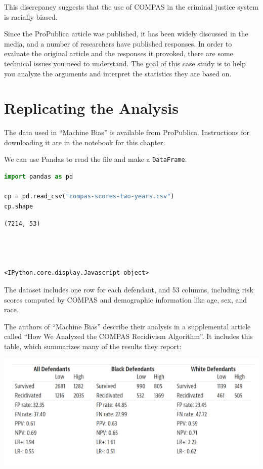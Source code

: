 This discrepancy suggests that the use of COMPAS in the criminal justice
system is racially biased.

Since the ProPublica article was published, it has been widely discussed
in the media, and a number of researchers have published responses. In
order to evaluate the original article and the responses it provoked,
there are some technical issues you need to understand. The goal of this
case study is to help you analyze the arguments and interpret the
statistics they are based on.

\hypertarget{replicating-the-analysis}{%
\section{Replicating the Analysis}\label{replicating-the-analysis}}

The data used in ``Machine Bias'' is available from ProPublica.
Instructions for downloading it are in the notebook for this chapter.

We can use Pandas to read the file and make a
\passthrough{\lstinline!DataFrame!}.

\begin{lstlisting}[language=Python,style=source]
import pandas as pd

cp = pd.read_csv("compas-scores-two-years.csv")
cp.shape
\end{lstlisting}

\begin{lstlisting}[style=output]
(7214, 53)




<IPython.core.display.Javascript object>
\end{lstlisting}

The dataset includes one row for each defendant, and 53 columns,
including risk scores computed by COMPAS and demographic information
like age, sex, and race.

The authors of ``Machine Bias'' describe their analysis in a
supplemental article called ``How We Analyzed the COMPAS Recidivism
Algorithm''. It includes this table, which summarizes many of the
results they report:

\includegraphics{chapters/figs/machine_bias_table.png}

